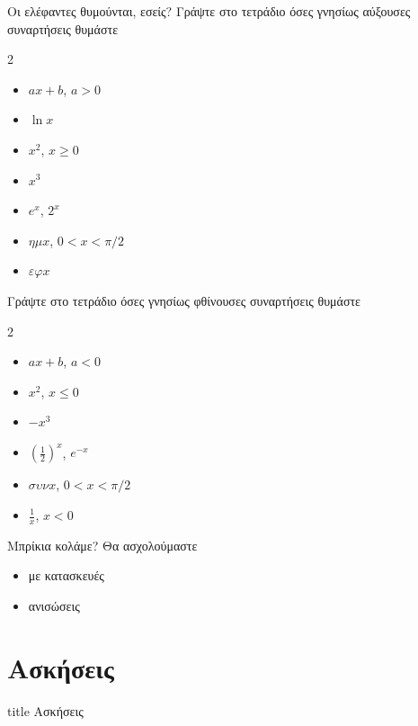 \documentclass{presentation}
\begin{document}
\begin{frame}{Οι ελέφαντες θυμούνται, εσείς?}
  Γράψτε στο τετράδιο όσες γνησίως αύξουσες συναρτήσεις θυμάστε \pause
  \begin{multicols}{2}
    \begin{itemize}
      \item $ax+b$, $a>0$
      \item $\ln x$
      \item $x^2$, $x\ge 0$
      \item $x^3$
      \item $e^x$, $2^x$
      \item $ημ x$, $0< x< \pi/2$
      \item $εφ x$
    \end{itemize} \pause
  \end{multicols}

  Γράψτε στο τετράδιο όσες γνησίως φθίνουσες συναρτήσεις θυμάστε \pause
  \begin{multicols}{2}
    \begin{itemize}
      \item $ax+b$, $a<0$
      \item $x^2$, $x\le 0$
      \item $-x^3$
      \item $\left(\frac{1}{2}\right)^x$, $e^{-x}$
      \item $συν x$, $0< x< \pi/2$
      \item $\frac{1}{x}$, $x<0$
    \end{itemize}
  \end{multicols}
\end{frame}

\begin{frame}{Μπρίκια κολάμε?}
  Θα ασχολούμαστε
  \begin{itemize}
    \item με κατασκευές
    \item ανισώσεις
  \end{itemize}
\end{frame}


\section{Ασκήσεις}

\begin{frame}[noframenumbering]
  \vfill
  \centering
  \begin{beamercolorbox}[sep=8pt,center,shadow=true,rounded=true]{title}
    Ασκήσεις
  \end{beamercolorbox}
  \vfill
\end{frame}
\end{document}
